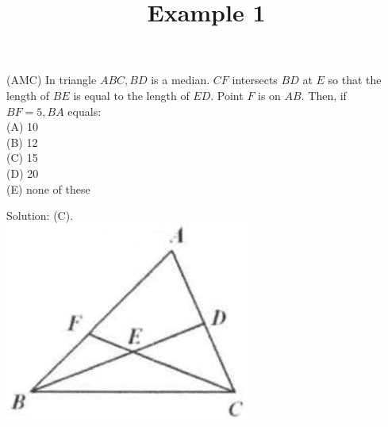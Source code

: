 \documentclass{article}
\title{Example 1}
\date{}
\begin{document}
\maketitle

(AMC) In triangle \(A B C, B D\) is a median. \(C F\) intersects \(B D\) at \(E\) so that the length of \(B E\) is equal to the length of \(E D\). Point \(F\) is on \(A B\). Then, if \(B F=5, B A\) equals:\\
(A) 10\\
(B) 12\\
(C) 15\\
(D) 20\\
(E) none of these

Solution: (C).\\
\centering
\includegraphics[width=\textwidth]{images/problem_image_1.jpg}
\end{document}
